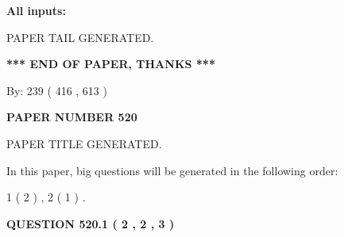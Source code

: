 \documentclass[12pt]{article}
\begin{document}
   
   
   
\noindent{}
   
   
   
   
\noindent\vspace{0.1in}\hspace{-0.08in} {\textbf{\Large{All inputs: }}}
   
   
   
   
   
   
 \vspace{0.2in}
 
   
   
\vspace{2.0in} PAPER TAIL GENERATED.
   
   
   
   
\vspace{1.0in} 
{\textbf{\large{ *** END OF PAPER, THANKS *** }}} 
   
   
\hspace{1.0in} By: 
 239 ( 416 ,  613 )
   
   
   
   
\newpage 
\setcounter{page}{ 
   520001 } 
   
   
   
   
 {\textbf{ \Large{ PAPER NUMBER  520  }}}
   
   
\vspace{0.2in}
   
   
   
   
   
   
   
   
 \vspace{0.2in}
 
 
 
 
   
   
 PAPER TITLE GENERATED.
   
   
   
\vspace{0.2in}
   
In this paper, big questions will be generated in the following order: 
   
   
   1 ( 2 )
 ,
   2 ( 1 )
 .
  
\vspace{0.2in}
  
{\textbf{\Large{QUESTION
520.1 
 ( 2 , 2 , 3 )
}}}
  
\end{document}
